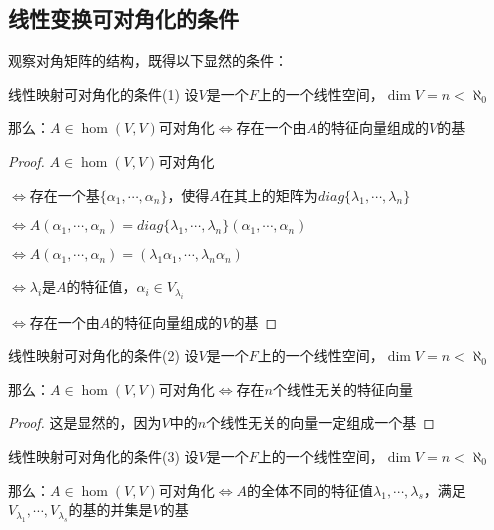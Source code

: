 \documentclass[12pt, a4paper, oneside, UTF8]{ctexbook}
\begin{document}
		\subsection{线性变换可对角化的条件}
			观察对角矩阵的结构，既得以下显然的条件：
			\begin{them}{线性映射可对角化的条件(1)}{}
				设$V$是一个$F$上的一个线性空间，$\dim V = n < \aleph_0$

				那么：$A \in \hom(V,V)$可对角化$\Leftrightarrow$存在一个由$A$的特征向量组成的$V$的基
			\end{them}
			\begin{proof}
				$A \in \hom(V,V)$可对角化

				$\Leftrightarrow$存在一个基$\{\alpha_1,\cdots,\alpha_n\}$，使得$A$在其上的矩阵为$diag\{\lambda_1,\cdots,\lambda_n\}$

				$\Leftrightarrow A(\alpha_1,\cdots,\alpha_n)=diag\{\lambda_1,\cdots,\lambda_n\}(\alpha_1,\cdots,\alpha_n)$

				$\Leftrightarrow A(\alpha_1,\cdots,\alpha_n)=(\lambda_1\alpha_1,\cdots,\lambda_n \alpha_n)$

				$\Leftrightarrow \lambda_i$是$A$的特征值，$\alpha_i \in V_{\lambda_i}$

				$\Leftrightarrow $存在一个由$A$的特征向量组成的$V$的基
			\end{proof}
			\begin{corollary}{线性映射可对角化的条件(2)}{}
				设$V$是一个$F$上的一个线性空间，$\dim V = n < \aleph_0$

				那么：$A \in \hom(V,V)$可对角化$\Leftrightarrow$存在$n$个线性无关的特征向量
			\end{corollary}
			\begin{proof}
				这是显然的，因为$V$中的$n$个线性无关的向量一定组成一个基
			\end{proof}
			\begin{them}{线性映射可对角化的条件(3)}{}
				设$V$是一个$F$上的一个线性空间，$\dim V = n < \aleph_0$

				那么：$A \in \hom(V,V)$可对角化$\Leftrightarrow A$的全体不同的特征值$\lambda_1,\cdots,\lambda_s$，满足$V_{\lambda_1},\cdots,V_{\lambda_s}$的基的并集是$V$的基
			\end{them}
\end{document}
